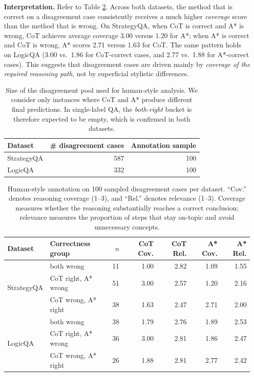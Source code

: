 \documentclass[11pt]{article}
\begin{document}
{\noindent\textbf{Interpretation.}
Refer to Table \ref{tab:disagreement-human-eval}. Across both datasets, the method that is correct on a disagreement case consistently receives a much higher \emph{coverage} score than the method that is wrong. On StrategyQA, when CoT is correct and A* is wrong, CoT achieves average coverage 3.00 versus 1.20 for A*; when A* is correct and CoT is wrong, A* scores 2.71 versus 1.63 for CoT. The same pattern holds on LogicQA (3.00 vs.\ 1.86 for CoT-correct cases, and 2.77 vs.\ 1.88 for A*-correct cases). This suggests that disagreement cases are driven mainly by \emph{coverage of the required reasoning path}, not by superficial stylistic differences.

\begin{table}[t]
\centering
\small
\begin{tabular}{lrr}
\toprule
Dataset & \# disagreement cases & Annotation sample \\
\midrule
StrategyQA & 587 & 100 \\
LogicQA     & 332 & 100 \\
\bottomrule
\end{tabular}
\caption{Size of the disagreement pool used for human-style analysis. We consider only instances where CoT and A* produce different final predictions. In single-label QA, the \textit{both-right} bucket is therefore expected to be empty, which is confirmed in both datasets.}
\label{tab:disagreement-pool}
\end{table}

\begin{table}[t]
\centering
\small
\begin{tabular}{llrrrrr}
\toprule
Dataset & Correctness group & $n$ & CoT Cov. & CoT Rel. & A* Cov. & A* Rel. \\
\midrule
\multirow{3}{*}{StrategyQA}
& both wrong            & 11 & 1.00 & 2.82 & 1.09 & 1.55 \\
& CoT right, A* wrong   & 51 & 3.00 & 2.57 & 1.20 & 2.16 \\
& CoT wrong, A* right   & 38 & 1.63 & 2.47 & 2.71 & 2.00 \\
\midrule
\multirow{3}{*}{LogicQA}
& both wrong            & 38 & 1.79 & 2.76 & 1.89 & 2.53 \\
& CoT right, A* wrong   & 36 & 3.00 & 2.81 & 1.86 & 2.47 \\
& CoT wrong, A* right   & 26 & 1.88 & 2.81 & 2.77 & 2.42 \\
\bottomrule
\end{tabular}
\caption{Human-style annotation on 100 sampled disagreement cases per dataset. “Cov.” denotes reasoning coverage (1--3), and “Rel.” denotes relevance (1--3). Coverage measures whether the reasoning substantially reaches a correct conclusion; relevance measures the proportion of steps that stay on-topic and avoid unnecessary concepts.}
\label{tab:disagreement-human-eval}
\end{table}




}
\end{document}
